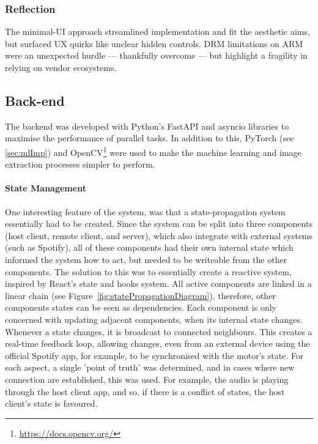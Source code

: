             \subsubsection*{Reflection}
                The minimal-UI approach streamlined implementation and fit the aesthetic aims, but surfaced UX quirks like unclear hidden controls. DRM limitations on ARM were an unexpected hurdle — thankfully overcome — but highlight a fragility in relying on vendor ecosystems.
    
        \subsection{Back-end} %
    
            The backend was developed with Python's FastAPI and asyncio libraries to maximise the performance of parallel tasks. In addition to this, PyTorch (see \ref{sec:mlImp}) and OpenCV\footnote{\url{https://docs.opencv.org/}} were used to make the machine learning and image extraction processes simpler to perform.
    
            \paragraph{State Management}
            One interesting feature of the system, was that a state-propagation system essentially had to be created. Since the system can be split into three components (host client, remote client, and server), which also integrate with external systems (such as Spotify), all of these components had their own internal state which informed the system how to act, but needed to be writeable from the other components. The solution to this was to essentially create a reactive system, inspired by React's state and hooks system. All active components are linked in a linear chain (see Figure~\ref{fig:statePropagationDiagram}), therefore, other components states can be seen as dependencies. Each component is only concerned with updating adjacent components, when its internal state changes. Whenever a state changes, it is broadcast to connected neighbours. This creates a real-time feedback loop, allowing changes, even from an external device using the official Spotify app, for example, to be synchronised with the motor's state. For each aspect, a single 'point of truth' was determined, and in cases where new connection are established, this was used. For example, the audio is playing through the host client app, and so, if there is a conflict of states, the host client's state is favoured.
            
